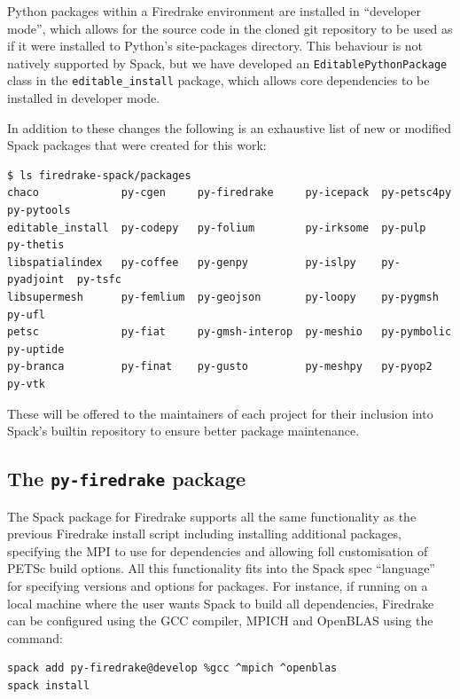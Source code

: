 \documentclass[a4paper,11pt]{article}
\begin{document}
Python packages within a Firedrake environment are installed in ``developer mode'', which allows for the source code in the cloned git repository to be used as if it were installed to Python's site-packages directory.
This behaviour is not natively supported by Spack, but we have developed an \verb`EditablePythonPackage` class in the \verb`editable_install` package, which allows core dependencies to be installed in developer mode.

In addition to these changes the following is an exhaustive list of new or modified Spack packages that were created for this work:
\begin{lstlisting}
$ ls firedrake-spack/packages
chaco             py-cgen     py-firedrake     py-icepack  py-petsc4py   py-pytools
editable_install  py-codepy   py-folium        py-irksome  py-pulp       py-thetis
libspatialindex   py-coffee   py-genpy         py-islpy    py-pyadjoint  py-tsfc
libsupermesh      py-femlium  py-geojson       py-loopy    py-pygmsh     py-ufl
petsc             py-fiat     py-gmsh-interop  py-meshio   py-pymbolic   py-uptide
py-branca         py-finat    py-gusto         py-meshpy   py-pyop2      py-vtk
\end{lstlisting}
These will be offered to the maintainers of each project for their inclusion into Spack's builtin repository to ensure better package maintenance.


\subsection{The \texttt{py-firedrake} package}
\label{ssec:py-firedrake}
The Spack package for Firedrake supports all the same functionality as the previous Firedrake install script including installing additional packages, specifying the MPI to use for dependencies and allowing foll customisation of PETSc build options.
All this functionality fits into the Spack spec ``language'' for specifying versions and options for packages.
For instance, if running on a local machine where the user wants Spack to build all dependencies, Firedrake can be configured using the GCC compiler, MPICH and OpenBLAS using the command:
\begin{lstlisting}
spack add py-firedrake@develop %gcc ^mpich ^openblas
spack install
\end{lstlisting}
\end{document}
